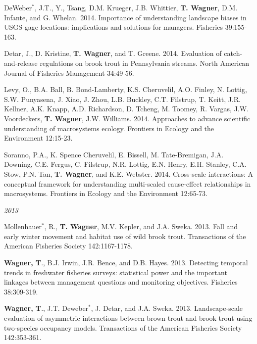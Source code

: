 \documentclass[10pt]{article}
\begin{document}
\begin{flushleft}
\begin{etaremune}[start=41]
\item DeWeber$^*$, J.T., Y., Tsang, D.M. Krueger, J.B. Whittier, {\bf T. Wagner}, D.M. Infante, and G. Whelan. 2014. Importance of understanding landscape biases in USGS gage locations: implications and solutions for managers. Fisheries 39:155-163. 

\item Detar, J., D. Kristine, {\bf T. Wagner}, and T. Greene. 2014. Evaluation of catch-and-release regulations on brook trout in Pennsylvania streams. North American Journal of Fisheries Management 34:49-56.

\item Levy, O., B.A. Ball, B. Bond-Lamberty, K.S. Cheruvelil,  A.O. Finley, N. Lottig, S.W. Punyasena, J. Xiao, J. Zhou, L.B. Buckley, C.T. Filstrup, T. Keitt, J.R. Kellner, A.K. Knapp, A.D. Richardson, D. Tcheng, M. Toomey, R. Vargas, J.W. Voordeckers, {\bf T.  Wagner}, J.W. Williams. 2014. Approaches to advance scientific understanding of macrosystems ecology. Frontiers in Ecology and the Environment 12:15-23. 

\item Soranno, P.A., K. Spence Cheruvelil, E. Bissell, M. Tate-Bremigan, J.A. Downing, C.E. Fergus, C. Filstrup, N.R. Lottig, E.N. Henry, E.H. Stanley, C.A. Stow, P.N. Tan, {\bf T. Wagner}, and K.E. Webster. 2014. Cross-scale interactions: A conceptual framework for understanding multi-scaled cause-effect relationships in macrosystems. Frontiers in Ecology and the Environment 12:65-73. 

\end{etaremune}
\emph{2013}
\begin{etaremune}[start=28]
\item Mollenhauer$^*$, R., {\bf T. Wagner}, M.V. Kepler, and J.A. Sweka. 2013. Fall and early winter movement and habitat use of wild brook trout. Transactions of the American Fisheries Society 142:1167-1178.

\item {\bf Wagner, T}., B.J. Irwin, J.R. Bence, and D.B. Hayes. 2013. Detecting temporal trends in freshwater fisheries surveys: statistical power and the important linkages between management questions and monitoring objectives. Fisheries 38:309-319.

\item {\bf Wagner, T}., J.T. Deweber$^*$, J. Detar, and J.A. Sweka. 2013. Landscape-scale evaluation of asymmetric interactions between brown trout and brook trout using two-species occupancy models. Transactions of the American Fisheries Society 142:353-361.


\end{etaremune}
\end{flushleft}
\end{document}
